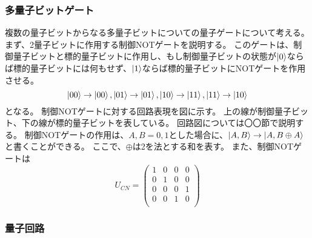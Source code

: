 \subsubsection{多量子ビットゲート}
複数の量子ビットからなる多量子ビットについての量子ゲートについて考える。
まず、2量子ビットに作用する制御NOTゲートを説明する。
このゲートは、制御量子ビットと標的量子ビットに作用し、もし制御量子ビットの状態が$\ket{0}$ならば標的量子ビットには何もせず、$\ket{1}$ならば標的量子ビットにNOTゲートを作用させる。
\begin{equation}
    \ket{00} \rightarrow \ket{00}, 
    \ket{01} \rightarrow \ket{01},
    \ket{10} \rightarrow \ket{11},
    \ket{11} \rightarrow \ket{10}
\end{equation}
となる。
制御NOTゲートに対する回路表現を図に示す。
上の線が制御量子ビット、下の線が標的量子ビットを表している。
回路図については〇〇節で説明する。
制御NOTゲートの作用は、$A, B = 0, 1$とした場合に、$\ket{A, B} \rightarrow \ket{A, B \oplus A}$と書くことができる。
ここで、$\oplus$は2を法とする和を表す。
また、制御NOTゲートは
\begin{equation}
    U_{CN} = \begin{pmatrix}
        1 & 0 & 0 & 0 \\
        0 & 1 & 0 & 0 \\
        0 & 0 & 0 & 1 \\
        0 & 0 & 1 & 0 \\
    \end{pmatrix}
\end{equation}

\subsubsection{量子回路}


